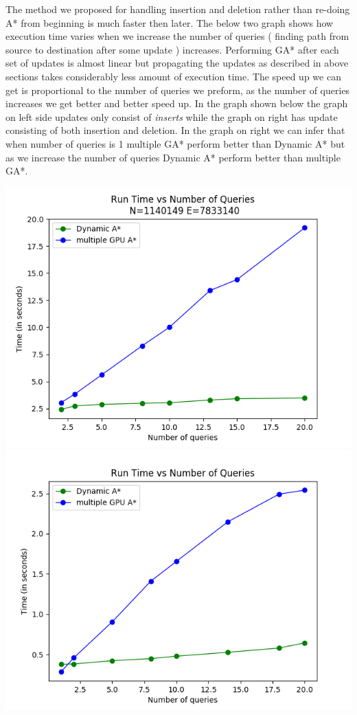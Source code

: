 \documentclass[a4paper]{article}
\begin{document}
The method we proposed for handling insertion and deletion rather than re-doing A* from beginning is much faster then later. The below two graph shows how execution time varies when we increase the number of queries ( finding path from source to destination after some update ) increases. Performing  GA* after each set of updates is almost linear but propagating the updates as described in above sections takes considerably less amount of execution time. The speed up we can get is proportional to the number of queries we preform, as the number of queries increases we get better and better speed up. In the graph shown below the graph on left side updates only consist of \textit{inserts} while the graph on right has update consisting of both insertion and deletion. In the graph on right we can infer that when number of queries is 1 multiple GA* perform better than Dynamic A* but as we increase the number of queries Dynamic A* perform better than multiple GA*.
\begin{center}
\includegraphics[scale=0.36]{img/TvQ_wikitalk.png}        
\includegraphics[scale=0.36]{img/QvT_dyn.png} 
\end{center}
\end{document}
